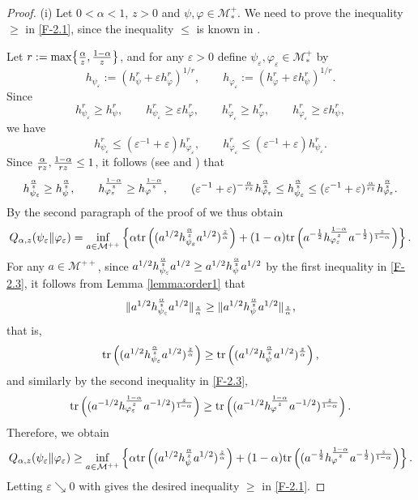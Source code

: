 \documentclass[12pt]{article}
\theoremstyle{definition}
\theoremstyle{remark}
\numberwithin{equation}{section}
\def\Me{\mathcal M}
\def\Tr{\mathrm{tr}}
\def\eps{\varepsilon}
\begin{document}
\begin{proof}
{\color{red}
(i)\enspace
Let $0<\alpha<1$, $z>0$ and $\psi,\varphi\in\Me_*^+$. We need to prove the inequality $\ge$ in
\eqref{F-2.1}, since the inequality $\le$ is known in \cite[Theorem 1(vi)]{kato2023onrenyi}.

Let $r:=\max\bigl\{{\alpha\over z},{1-\alpha\over z}\bigr\}$, and for any $\eps>0$ define
$\psi_\eps,\varphi_\eps\in\Me_*^+$ by
\[
h_{\psi_\eps}:=(h_\psi^r+\eps h_\varphi^r)^{1/r},\qquad
h_{\varphi_\eps}:=(h_\varphi^r+\eps h_\psi^r)^{1/r}.
\]
Since
\[
h_{\psi_\eps}^r\ge h_\psi^r,\qquad h_{\psi_\eps}^r\ge\eps h_\varphi^r,\qquad
h_{\varphi_\eps}^r\ge h_\varphi^r,\qquad h_{\varphi_\eps}^r\ge\eps h_\psi^r,
\]
we have
\[
h_{\psi_\eps}^r\le(\eps^{-1}+\eps)h_{\varphi_\eps}^r,\qquad
h_{\varphi_\eps}^r\le(\eps^{-1}+\eps)h_{\psi_\eps}^r.
\]
Since ${\alpha\over rz},{1-\alpha\over rz}\le1$, it follows (see \cite[Lemma B.7]{hiai2021quantum} and
\cite[Lemma 3.2]{hiai2021connections}) that
\begin{align}\label{F-2.3}
h_{\psi_\eps}^{\alpha\over z}\ge h_\psi^{\alpha\over z},\qquad
h_{\varphi_\eps}^{1-\alpha\over z}\ge h_\varphi^{1-\alpha\over z},\qquad
(\eps^{-1}+\eps)^{-{\alpha\over rz}}h_{\varphi_\eps}^{\alpha\over z}
\le h_{\psi_\eps}^{\alpha\over z}\le
(\eps^{-1}+\eps)^{\alpha\over rz}h_{\varphi_\eps}^{\alpha\over z}.
\end{align}
By the second paragraph of the proof of \cite[Theorem 1(vi)]{kato2023onrenyi} we thus obtain
\[
Q_{\alpha,z}(\psi_\eps\|\varphi_\eps)=\inf_{a\in\Me^{++}}
\left\{\alpha\Tr\left((a^{1/2}h_{\psi_\eps}^{\alpha\over z}a^{1/2})^{z\over\alpha}\right)
+(1-\alpha)\Tr\left(a^{-{1\over2}}h_{\varphi_\eps}^{1-\alpha\over z}a^{-{1\over2}})^{z\over1-\alpha}
\right)\right\}.
\]
For any $a\in\Me^{++}$, since
$a^{1/2}h_{\psi_\eps}^{\alpha\over z}a^{1/2}\ge a^{1/2}h_\psi^{\alpha\over z}a^{1/2}$ by the first
inequality in \eqref{F-2.3}, it follows from Lemma \ref{lemma:order1} that
\[
\|a^{1/2}h_{\psi_\eps}^{\alpha\over z}a^{1/2}\|_{z\over\alpha}
\ge\|a^{1/2}h_\psi^{\alpha\over z}a^{1/2}\|_{z\over\alpha},
\]
that is,
\[
\Tr\left((a^{1/2}h_{\psi_\eps}^{\alpha\over z}a^{1/2})^{z\over\alpha}\right)
\ge\Tr\left((a^{1/2}h_\psi^{\alpha\over z}a^{1/2})^{z\over\alpha}\right),
\]
and similarly by the second inequality in \eqref{F-2.3},
\[
\Tr\left((a^{-1/2}h_{\varphi_\eps}^{1-\alpha\over z}a^{-1/2})^{z\over1-\alpha}\right)
\ge\Tr\left((a^{-1/2}h_\varphi^{1-\alpha\over z}a^{-1/2})^{z\over1-\alpha}\right).
\]
Therefore, we obtain
\[
Q_{\alpha,z}(\psi_\eps\|\varphi_\eps)\ge\inf_{a\in\Me^{++}}
\left\{\alpha\Tr\left((a^{1/2}h_\psi^{\alpha\over z}a^{1/2})^{z\over\alpha}\right)
+(1-\alpha)\Tr\left((a^{-{1\over2}}h_\varphi^{1-\alpha\over z}a^{-{1\over2}})^{z\over1-\alpha}
\right)\right\}.
\]
Letting $\eps\searrow0$ with \cite[Lemma 6 and Theorem 1(iv)]{kato2023onrenyi} gives the desired
inequality $\ge$ in \eqref{F-2.1}.
}


\end{proof}
\end{document}
